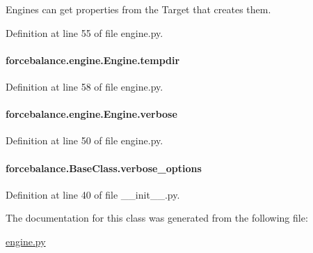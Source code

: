 Engines can get properties from the Target that creates them. 



Definition at line 55 of file engine.\-py.

\hypertarget{classforcebalance_1_1engine_1_1Engine_a7bb2deae7ee926f0df7758a92b382515}{
\paragraph[{tempdir}]{\setlength{\rightskip}{0pt plus 5cm}forcebalance.\-engine.\-Engine.\-tempdir}}\label{classforcebalance_1_1engine_1_1Engine_a7bb2deae7ee926f0df7758a92b382515}


Definition at line 58 of file engine.\-py.

\hypertarget{classforcebalance_1_1engine_1_1Engine_a29b97ebf8984e50fd19eb831715ab659}{
\paragraph[{verbose}]{\setlength{\rightskip}{0pt plus 5cm}forcebalance.\-engine.\-Engine.\-verbose}}\label{classforcebalance_1_1engine_1_1Engine_a29b97ebf8984e50fd19eb831715ab659}


Definition at line 50 of file engine.\-py.

\hypertarget{classforcebalance_1_1BaseClass_afd68efa29ccd2f320f4cf82198214aac}{
\paragraph[{verbose\-\_\-options}]{\setlength{\rightskip}{0pt plus 5cm}forcebalance.\-Base\-Class.\-verbose\-\_\-options\hspace{0.3cm}{\ttfamily [inherited]}}}\label{classforcebalance_1_1BaseClass_afd68efa29ccd2f320f4cf82198214aac}


Definition at line 40 of file \-\_\-\-\_\-init\-\_\-\-\_\-.\-py.



The documentation for this class was generated from the following file\-:\begin{DoxyCompactItemize}
\item 
\hyperlink{engine_8py}{engine.\-py}\end{DoxyCompactItemize}
